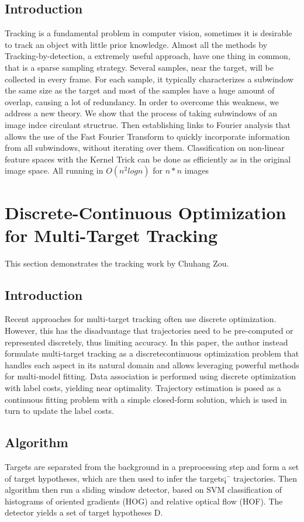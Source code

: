 \documentclass{article}
\begin{document}
\subsection{Introduction}
Tracking is a fundamental problem in computer vision, sometimes it is desirable to track an object with little prior knowledge. Almost all the methods by Tracking-by-detection, a extremely useful approach, have one thing in common, that is a sparse sampling strategy. Several samples, near the target, will be collected in every frame. For each sample, it typically characterizes a subwindow the same size as the target and most of the samples have a huge amount of overlap, causing a lot of redundancy. In order to overcome this weakness, we address a new theory. We show that the process of taking subwindows of an image indce circulant structrue. Then establishing links to Fourier analysis that allows the use of the Fast Fourier Transform to quickly incorporate information from all subwindows, without iterating over them. Classification on non-linear feature spaces with the Kernel Trick can be done as efficiently as in the original image space. All running in $O(n^2 logn)$ for $n * n$ images


\section{Discrete-Continuous Optimization for Multi-Target Tracking}
This section demonstrates the tracking work by Chuhang Zou.

\subsection{Introduction}
Recent approaches for multi-target tracking often use discrete optimization. However, this has the disadvantage that trajectories need to be pre-computed or represented discretely, thus limiting accuracy. In this paper, the author instead formulate multi-target tracking as a discretecontinuous optimization problem that handles each aspect in its natural domain and allows leveraging powerful methods for multi-model fitting. Data association is performed using discrete optimization with label costs, yielding near optimality. Trajectory estimation is posed as a continuous fitting problem with a simple closed-form solution, which is used in turn to update the label costs.

\subsection{Algorithm}
Targets are separated from the background in a preprocessing step and form a set of target hypotheses, which are then used to infer the targets¡¯ trajectories. Then algorithm then run a sliding window detector, based on SVM classification of histograms of oriented gradients (HOG) and relative optical flow (HOF). The detector yields a set of target hypotheses D.
\end{document}

